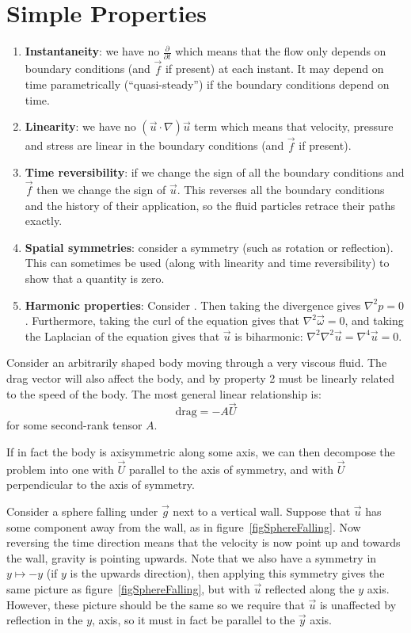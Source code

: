 \documentclass[../Main.tex]{subfiles}
\begin{document}
\section{Simple Properties}
\begin{enumerate}
    \item \textbf{Instantaneity}: we have no $\frac{\partial}{\partial t}$ which means that the flow only depends on boundary conditions (and $\vec{f}$ if present) at each instant. It may depend on time parametrically (``quasi-steady'') if the boundary conditions depend on time.
    \item \textbf{Linearity}: we have no $(\vec{u} \cdot \nabla)\vec{u}$ term which means that velocity, pressure and stress are linear in the boundary conditions (and $\vec{f}$ if present).
    \item \textbf{Time reversibility}: if we change the sign of all the boundary conditions and $\vec{f}$ then we change the sign of $\vec{u}$. This reverses all the boundary conditions and the history of their application, so the fluid particles retrace their paths exactly.
    \item \textbf{Spatial symmetries}: consider a symmetry (such as rotation or reflection). This can sometimes be used (along with linearity and time reversibility) to show that a quantity is zero.
    \item \textbf{Harmonic properties}: Consider . Then taking the divergence gives $\nabla^2 p = 0$. Furthermore, taking the curl of the equation gives that $\nabla^2 \vec{\omega} = 0$, and taking the Laplacian of the equation gives that $\vec{u}$ is biharmonic: $\nabla^2 \nabla^2 \vec{u} = \nabla^4 \vec{u} = 0$.
\end{enumerate}
\begin{example}
    Consider an arbitrarily shaped body moving through a very viscous fluid. The drag vector will also affect the body, and by property 2 must be linearly related to the speed of the body. The most general linear relationship is:
    \begin{equation*}
        \text{drag} = -A\vec{U}
    \end{equation*}
    for some second-rank tensor $A$.

    If in fact the body is axisymmetric along some axis, we can then decompose the problem into one with $\vec{U}$ parallel to the axis of symmetry, and with $\vec{U}$ perpendicular to the axis of symmetry.
    \label{exParallelToWall}
\end{example}
\begin{example}
    Consider a sphere falling under $\vec{g}$ next to a vertical wall. Suppose that $\vec{u}$ has some component away from the wall, as in figure~\ref{figSphereFalling}. Now reversing the time direction means that the velocity is now point up and towards the wall, gravity is pointing upwards. Note that we also have a symmetry in $y \mapsto -y$ (if $y$ is the upwards direction), then applying this symmetry gives the same picture as figure~\ref{figSphereFalling}, but with $\vec{u}$ reflected along the $y$ axis. However, these picture should be the same so we require that $\vec{u}$ is unaffected by reflection in the $y$, axis, so it must in fact be parallel to the $\vec{y}$ axis.
\end{example}
\end{document}
